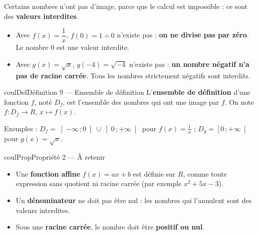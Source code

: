 \documentclass[11pt,a4paper]{article}
\makeatletter
\newcommand{\R}{\mathbb{R}}
\newcommand{\N}{\mathbb{N}}
\newcommand{\Z}{\mathbb{Z}}
\newcommand{\Q}{\mathbb{Q}}
\newcommand{\vect}[1]{\overrightarrow{#1}}
\newcommand{\fois}[1]{\times{\color{coulExo}#1}}
\newcommand{\lycee@intfo}[2]{\left[#1\,;#2\right[}
\newcommand{\lycee@intoo}[2]{\left]#1\,;#2\right[}
\providecommand{\Cf}{\mathcal{C}\sb{f}}%
\providecommand{\Cg}{\mathcal{C}\sb{g}}%
\providecommand{\intfo}{\lycee@intfo}%
\providecommand{\intoo}{\lycee@intoo}%
\newcounter{lycee@signet}
\newcommand{\signet}[3][]{\stepcounter{lycee@signet}%
  \edef\lycee@dest{\if\relax\detokenize{#1}\relax
    signet.\arabic{lycee@signet}\else#1\fi}%
  \hypertarget{\lycee@dest}{}\bookmark[level=#2,dest=\lycee@dest]{#3}}
\def\R{R}\def\N{N}\def\Z{Z}\def\Q{Q}\def\vect#1{#1}\def\Cf{Cf}\def\Cg{Cg}\def\fois#1{×#1}%
\newenvironment{definitionbox}[1][Définition]%
  {\begin{boitecours}[phantom={\signet{2}{#1}}]{coulDef}{#1}}{\end{boitecours}}
\newenvironment{proprietebox}[1][Propriété]%
  {\begin{boitecours}[phantom={\signet{2}{#1}}]{coulProp}{#1}}{\end{boitecours}}
\makeatother
\begin{document}
\begin{exemplebox}
Certains nombres n'ont pas d'image, parce que le calcul est impossible : ce sont des
\textbf{valeurs interdites}.
\begin{itemize}
  \item Avec $f(x)=\dfrac{1}{x}$, $f(0)=1\div 0$ n'existe pas : \textbf{on ne divise pas
        par zéro}. Le nombre $0$ est une valeur interdite.
  \item Avec $g(x)=\sqrt{x}$, $g(-4)=\sqrt{-4}$ n'existe pas : \textbf{un nombre négatif
        n'a pas de racine carrée}. Tous les nombres strictement négatifs sont interdits.
\end{itemize}
\end{exemplebox}

\begin{definitionbox}[Définition 9 --- Ensemble de définition]
L'\textbf{ensemble de définition} d'une fonction $f$, noté $D_f$, est l'ensemble des
nombres qui ont une image par $f$. On note $f : D_f\longrightarrow\R$,
$x\longmapsto f(x)$.

\smallskip
Exemples : $D_f=\intoo{-\infty}{0}\cup\intoo{0}{+\infty}$ pour $f(x)=\frac1x$ ;
$D_g=\intfo{0}{+\infty}$ pour $g(x)=\sqrt{x}$.
\end{definitionbox}

\begin{proprietebox}[Propriété 2 --- À retenir]
\begin{itemize}
  \item Une \textbf{fonction affine} $f(x)=ax+b$ est définie sur $\R$, comme toute
        expression sans quotient ni racine carrée (par exemple $x^{2}+5x-3$).
  \item Un \textbf{dénominateur} ne doit pas être nul : les nombres qui l'annulent sont
        des valeurs interdites.
  \item Sous une \textbf{racine carrée}, le nombre doit être \textbf{positif ou nul}.
\end{itemize}
\end{proprietebox}
\end{document}
